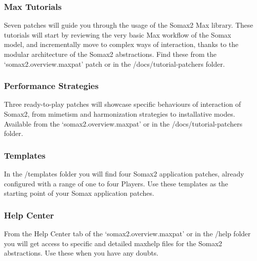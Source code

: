 \subsubsection{Max Tutorials}

Seven patches will guide you through the usage of the Somax2 Max library. These tutorials will start by reviewing the very basic Max workflow of the Somax model, and incrementally move to complex ways of interaction, thanks to the modular architecture of the Somax2 abstractions. Find these from the `somax2.overview.maxpat' patch or in the /docs/tutorial-patchers folder.

\subsubsection{Performance Strategies}

Three ready-to-play patches will showcase specific behaviours of interaction of Somax2, from mimetism and harmonization strategies to installative modes. Available from the `somax2.overview.maxpat' or in the /docs/tutorial-patchers folder.

\subsubsection{Templates}

In the /templates folder you will find four Somax2 application patches, already configured with a range of one to four Players.
Use these templates as the starting point of your Somax application patches.

\subsubsection{Help Center}

From the Help Center tab of the `somax2.overview.maxpat' or in the /help folder you will get access to specific and detailed maxhelp files for the Somax2 abstractions. Use these when you have any doubts. 

